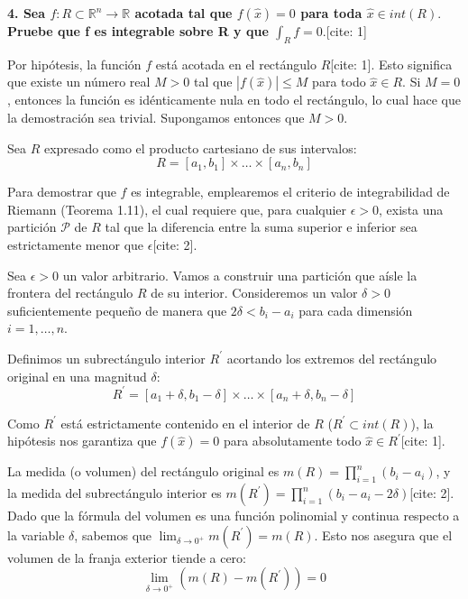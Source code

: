 \documentclass[11pt,letterpaper]{article}
\begin{document}
\textbf{4. Sea $f:R\subset\mathbb{R}^{n}\rightarrow\mathbb{R}$ acotada tal que $f(\hat{x})=0$ para toda $\hat{x}\in int(R).$ Pruebe que f es integrable sobre R y que $\int_{R}f=0.$}[cite: 1]

Por hipótesis, la función $f$ está acotada en el rectángulo $R$[cite: 1]. Esto significa que existe un número real $M > 0$ tal que $|f(\hat{x})| \le M$ para todo $\hat{x} \in R$. Si $M = 0$, entonces la función es idénticamente nula en todo el rectángulo, lo cual hace que la demostración sea trivial. Supongamos entonces que $M > 0$.

Sea $R$ expresado como el producto cartesiano de sus intervalos:
\begin{equation*}
R = [a_{1}, b_{1}] \times \dots \times [a_{n}, b_{n}]
\end{equation*}

Para demostrar que $f$ es integrable, emplearemos el criterio de integrabilidad de Riemann (Teorema 1.11), el cual requiere que, para cualquier $\epsilon > 0$, exista una partición $\mathcal{P}$ de $R$ tal que la diferencia entre la suma superior e inferior sea estrictamente menor que $\epsilon$[cite: 2].

Sea $\epsilon > 0$ un valor arbitrario. Vamos a construir una partición que aísle la frontera del rectángulo $R$ de su interior. Consideremos un valor $\delta > 0$ suficientemente pequeño de manera que $2\delta < b_{i} - a_{i}$ para cada dimensión $i = 1, \dots, n$.

Definimos un subrectángulo interior $R^{\prime}$ acortando los extremos del rectángulo original en una magnitud $\delta$:
\begin{equation*}
R^{\prime} = [a_{1}+\delta, b_{1}-\delta] \times \dots \times [a_{n}+\delta, b_{n}-\delta]
\end{equation*}

Como $R^{\prime}$ está estrictamente contenido en el interior de $R$ ($R^{\prime} \subset int(R)$), la hipótesis nos garantiza que $f(\hat{x}) = 0$ para absolutamente todo $\hat{x} \in R^{\prime}$[cite: 1].

La medida (o volumen) del rectángulo original es $m(R) = \prod_{i=1}^{n} (b_{i} - a_{i})$, y la medida del subrectángulo interior es $m(R^{\prime}) = \prod_{i=1}^{n} (b_{i} - a_{i} - 2\delta)$[cite: 2]. Dado que la fórmula del volumen es una función polinomial y continua respecto a la variable $\delta$, sabemos que $\lim_{\delta \to 0^{+}} m(R^{\prime}) = m(R)$. Esto nos asegura que el volumen de la franja exterior tiende a cero:
\begin{equation*}
\lim_{\delta \to 0^{+}} (m(R) - m(R^{\prime})) = 0
\end{equation*}
\end{document}
